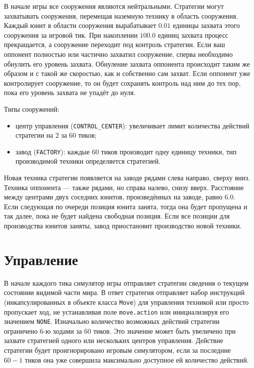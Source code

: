 В начале игры все сооружения являются нейтральными. Стратегии могут захватывать сооружения, перемещая наземную технику в область сооружения.
Каждый юнит в области сооружения вырабатывает $0.01$ единицы захвата этого сооружения за игровой тик. При накоплении $100.0$ единиц захвата
процесс прекращается, а сооружение переходит под контроль стратегии. Если ваш оппонент полностью или частично захватил сооружение, сперва
необходимо обнулить его уровень захвата. Обнуление захвата оппонента происходит таким же образом и с такой же скоростью, как и собственно
сам захват. Если оппонент уже контролирует сооружение, то он будет сохранять контроль над ним до тех пор, пока его уровень захвата не упадёт
до нуля.

Типы сооружений:
\begin{itemize}
    \item центр управления (\texttt{CONTROL\_CENTER}): увеличивает лимит количества действий стратегии на $2$ за $60$ тиков;
    \item завод (\texttt{FACTORY}): каждые $60$ тиков производит одну единицу техники, тип производимой техники определяется стратегией.
\end{itemize}

Новая техника стратегии появляется на заводе рядами слева направо, сверху вниз. Техника оппонента --- также рядами, но справа налево, снизу
вверх. Расстояние между центрами двух соседних юнитов, произведённых на заводе, равно $6.0$. Если следующая по очереди позиция юнита занята,
тогда она будет пропущена и так далее, пока не будет найдена свободная позиция. Если все позиции для производства юнитов заняты, завод
приостановит производство новой техники.

\section{Управление}

В начале каждого тика симулятор игры отправляет стратегии сведения о текущем состоянии видимой части мира. В ответ стратегия отправляет
набор инструкций (инкапсулированных в объекте класса \texttt{Move}) для управления техникой или просто пропускает ход, не устанавливая поле
\texttt{move.action} или инициализируя его значением \texttt{NONE}. Изначально количество возможных действий стратегии ограничено $6$-ю
ходами за $60$ тиков. Это значение может быть увеличено при захвате стратегией одного или нескольких центров управления. Действие стратегии
будет проигнорировано игровым симулятором, если за последние $60 - 1$ тиков она уже совершила максимально доступное ей количество действий.

